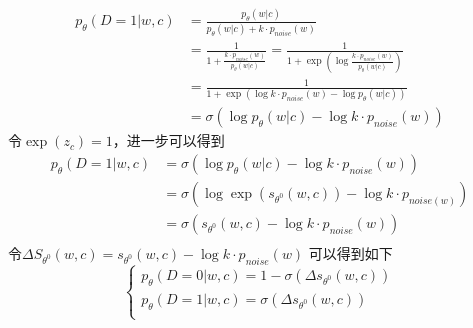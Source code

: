 \documentclass{article}
\begin{document}
\begin{equation}
    \begin{split}
        p_\theta(D=1|w,c) &= \frac{p_\theta(w|c)}{p_\theta(w|c)+ k\cdot p_{noise}(w)} \\
        &= \frac{1}{1+ \frac{k \cdot p_{noise}(w)}{p_\theta(w|c)}} = \frac{1}{1+ \exp (\log \frac{k \cdot p_{noise}(w)}{p_\theta(w|c)})} \\
        &= \frac{1}{1+ \exp (\log k \cdot p_{noise}(w) - \log p_\theta(w|c))} \\
        &= \sigma(\log p_\theta(w|c) - \log k \cdot p_{noise}(w))
    \end{split}
\end{equation}
令$\exp(z_c)=1$，进一步可以得到
\begin{equation}
    \begin{split}
        p_\theta(D=1|w,c) &= \sigma(\log p_\theta(w|c) - \log k \cdot p_{noise}(w)) \\
        &= \sigma (\log \exp (s_{\theta^0}(w,c)) - \log k \cdot p_{noise(w)}) \\
        &= \sigma (s_{\theta^0} (w,c) - \log k \cdot p_{noise}(w)) \\
    \end{split}
\end{equation}
令$\Delta S_{\theta^0}(w,c) = s_{\theta^0}(w,c) - \log k \cdot p_{noise}(w)$
可以得到如下
\begin{equation}
    \begin{cases}
        p_\theta(D=0|w,c) = 1-\sigma(\Delta s_{\theta^0}(w,c))\\
        p_\theta(D=1|w,c) = \sigma(\Delta s_{\theta^0}(w,c))\\
    \end{cases}
    \label{EQ:NCE_Simplification_ReplaceTheta}
\end{equation}
\end{document}
